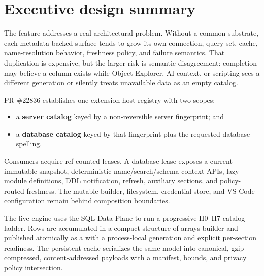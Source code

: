 \documentclass[11pt]{article}
\newcommand{\code}[1]{\texttt{\detokenize{#1}}}
\begin{document}
\section{Executive design summary}

The feature addresses a real architectural problem. Without a common substrate, each metadata-backed surface tends to grow its own connection, query set, cache, name-resolution behavior, freshness policy, and failure semantics. That duplication is expensive, but the larger risk is semantic disagreement: completion may believe a column exists while Object Explorer, AI context, or scripting sees a different generation or silently treats unavailable data as an empty catalog.

PR \#22836 establishes one extension-host registry with two scopes:

\begin{itemize}
  \item a \textbf{server catalog} keyed by a non-reversible server fingerprint; and
  \item a \textbf{database catalog} keyed by that fingerprint plus the requested database spelling.
\end{itemize}

Consumers acquire ref-counted leases. A database lease exposes a current immutable snapshot, deterministic name/search/schema-context APIs, lazy module definitions, DDL notification, refresh, auxiliary sections, and policy-routed freshness. The mutable builder, filesystem, credential store, and VS Code configuration remain behind composition boundaries.

The live engine uses the SQL Data Plane to run a progressive H0--H7 catalog ladder. Rows are accumulated in a compact structure-of-arrays builder and published atomically as a \code{CatalogSnapshot} with a process-local generation and explicit per-section readiness. The persistent cache serializes the same model into canonical, gzip-compressed, content-addressed payloads with a manifest, bounds, and privacy policy intersection.
\end{document}
